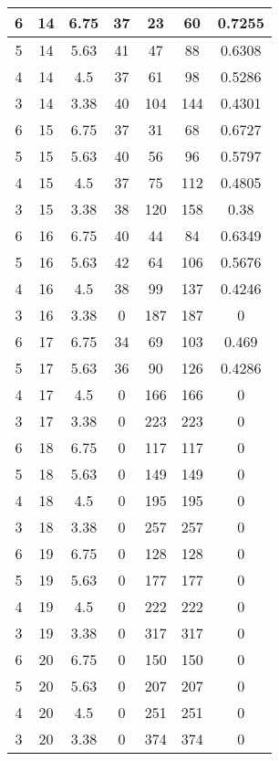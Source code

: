 \documentclass[letterpaper, 12pt]{article}
\begin{document}
\begin{longtable}{|c|c|c|c|c|c|c|}
\hline
6 & 14 & 6.75 & 37 & 23 & 60 & 0.7255 \\
\hline
5 & 14 & 5.63 & 41 & 47 & 88 & 0.6308 \\
\hline
4 & 14 & 4.5 & 37 & 61 & 98 & 0.5286 \\
\hline
3 & 14 & 3.38 & 40 & 104 & 144 & 0.4301 \\
\hline
6 & 15 & 6.75 & 37 & 31 & 68 & 0.6727 \\
\hline
5 & 15 & 5.63 & 40 & 56 & 96 & 0.5797 \\
\hline
4 & 15 & 4.5 & 37 & 75 & 112 & 0.4805 \\
\hline
3 & 15 & 3.38 & 38 & 120 & 158 & 0.38 \\
\hline
6 & 16 & 6.75 & 40 & 44 & 84 & 0.6349 \\
\hline
5 & 16 & 5.63 & 42 & 64 & 106 & 0.5676 \\
\hline
4 & 16 & 4.5 & 38 & 99 & 137 & 0.4246 \\
\hline
3 & 16 & 3.38 & 0 & 187 & 187 & 0 \\
\hline
6 & 17 & 6.75 & 34 & 69 & 103 & 0.469 \\
\hline
5 & 17 & 5.63 & 36 & 90 & 126 & 0.4286 \\
\hline
4 & 17 & 4.5 & 0 & 166 & 166 & 0 \\
\hline
3 & 17 & 3.38 & 0 & 223 & 223 & 0 \\
\hline
6 & 18 & 6.75 & 0 & 117 & 117 & 0 \\
\hline
5 & 18 & 5.63 & 0 & 149 & 149 & 0 \\
\hline
4 & 18 & 4.5 & 0 & 195 & 195 & 0 \\
\hline
3 & 18 & 3.38 & 0 & 257 & 257 & 0 \\
\hline
6 & 19 & 6.75 & 0 & 128 & 128 & 0 \\
\hline
5 & 19 & 5.63 & 0 & 177 & 177 & 0 \\
\hline
4 & 19 & 4.5 & 0 & 222 & 222 & 0 \\
\hline
3 & 19 & 3.38 & 0 & 317 & 317 & 0 \\
\hline
6 & 20 & 6.75 & 0 & 150 & 150 & 0 \\
\hline
5 & 20 & 5.63 & 0 & 207 & 207 & 0 \\
\hline
4 & 20 & 4.5 & 0 & 251 & 251 & 0 \\
\hline
3 & 20 & 3.38 & 0 & 374 & 374 & 0 \\
\hline
\end{longtable}
\end{document}
